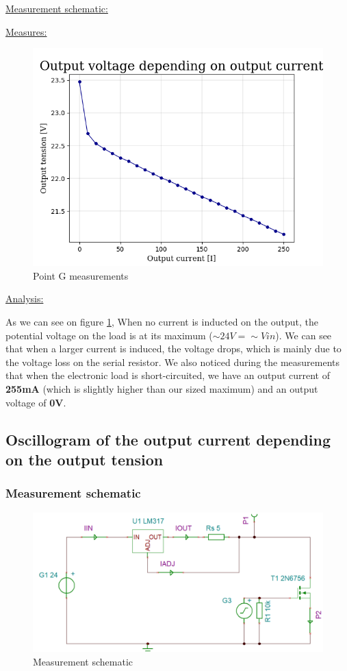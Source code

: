 {\clearpage

\underline{Measurement schematic:}


\underline{Measures:}
\begin{figure}[h]
	\centering
	\includegraphics[width=0.8\linewidth]{../../Grph-pointG}
	\caption{Point G measurements}
	\label{fig:grph-pointg}
\end{figure}

\underline{Analysis:}

As we can see on figure \ref{fig:grph-pointg}, When no current is inducted on the output, the potential voltage on the load is at its maximum (\textbf{$\sim 24V = \sim Vin$}). We can see that when a larger current is induced, the voltage drops, which is mainly due to the voltage loss on the serial resistor. We also noticed during the measurements that when the electronic load is short-circuited, we have an output current of \textbf{255mA} (which is slightly higher than our sized maximum) and an output voltage of \textbf{0V}.


}

\newpage
\subsection{Oscillogram of the output current depending on the output tension} \label{ssec:num13}
{
	
\subsubsection{Measurement schematic}
\begin{figure}[h]
	\centering
	\includegraphics[width=0.8\linewidth]{../../schemaMesurePulses}
	\caption{Measurement schematic}
	\label{fig:schemamesurepulses}
\end{figure}


}
\clearpage

